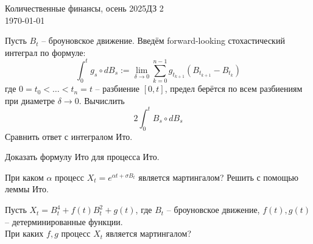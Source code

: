 \documentclass[12pt]{article}
\begin{document}
\noindent Количественные финансы, осень 2025\hfill ДЗ 2\\
\today

\hrulefill

\begin{problem}
    Пусть $B_t$ -- броуновское движение.  Введём forward-looking стохастический интеграл по формуле:
    $$
        \int_0^t g_s \circ dB_s := \lim_{\delta \to 0} \sum_{k=0}^{n-1} g_{t_{k+1}} (B_{t_{k+1}} - B_{t_k})
    $$где $0=t_0 < \ldots < t_n = t$ -- разбиение $[0, t]$, предел берётся по всем разбиениям при диаметре $\delta \to 0$. Вычислить
    $$
        2 \int_0^t B_s \circ dB_s
    $$Сравнить ответ с интегралом Ито.
\end{problem}

\begin{problem}
    Доказать формулу Ито для процесса Ито.
\end{problem}

\begin{problem}
    При каком $\alpha$ процесс $X_t = e^{\alpha t + \sigma B_t}$ является мартингалом? Решить с помощью леммы Ито.
\end{problem}
 
\begin{problem}
    Пусть $X_t = B_t^4 + f(t) B_t^2 + g(t)$, где $B_t$ -- броуновское движение, $f(t), g(t)$ -- детерминированные функции. 
    \\ При каких $f, g$ процесс $X_t$ является мартингалом? 
\end{problem}
\end{document}
